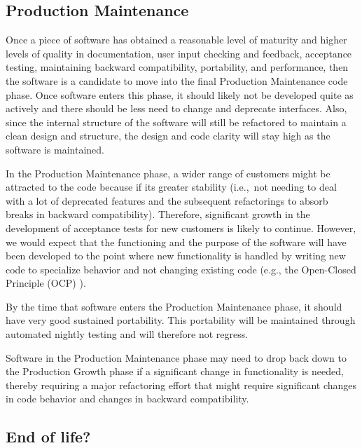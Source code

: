 \documentclass[11pt]{SANDreport}
\begin{document}
%
{}\subsection{Production Maintenance}
%

Once a piece of software has obtained a reasonable level of maturity
and higher levels of quality in documentation, user input checking and
feedback, acceptance testing, maintaining backward compatibility,
portability, and performance, then the software is a candidate to move
into the final Production Maintenance code phase.  Once software
enters this phase, it should likely not be developed quite as actively
and there should be less need to change and deprecate interfaces.
Also, since the internal structure of the software will still be
refactored to maintain a clean design and structure, the design and
code clarity will stay high as the software is maintained.

In the Production Maintenance phase, a wider range of customers might
be attracted to the code because if its greater stability (i.e.,\ not
needing to deal with a lot of deprecated features and the subsequent
refactorings to absorb breaks in backward compatibility).  Therefore,
significant growth in the development of acceptance tests for new
customers is likely to continue.  However, we would expect that the
functioning and the purpose of the software will have been developed
to the point where new functionality is handled by writing new code to
specialize behavior and not changing existing code (e.g., the
Open-Closed Principle (OCP) {}\cite{AgileSoftwareDevelopment}).

By the time that software enters the Production Maintenance phase, it
should have very good sustained portability.  This portability will be
maintained through automated nightly testing and will therefore not
regress.

Software in the Production Maintenance phase may need to drop back
down to the Production Growth phase if a significant change in
functionality is needed, thereby requiring a major refactoring effort
that might require significant changes in code behavior and changes in
backward compatibility.


%
\subsection{End of life?}
%
\end{document}
